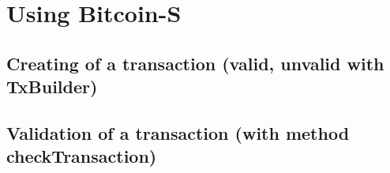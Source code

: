 \chapter{Using Bitcoin-S}
\label{chap:using_bitcoins}

\section{Creating of a transaction (valid, unvalid with TxBuilder)}

\section{Validation of a transaction (with method checkTransaction)}
